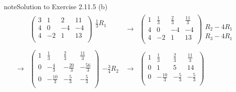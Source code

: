 \documentclass[letterpaper,10pt,english]{jupyterBook}
\begin{document}
\begin{sphinxadmonition}{note}{Solution to Exercise 2.11.5}
\sphinxAtStartPar
(b)
\begin{equation*}
\begin{split} \begin{align*} 
    & \left( \begin{array}{ccc|c} 
         3 & 1 & 2 & 11 \\ 
         4 & 0 & -4 & -4 \\ 
         4 & -2 & 1 & 13 \\ 
    \end{array} \right) 
    \begin{array}{l} \frac{1}{3} R_{1}\\ \phantom{x} \\ \phantom{x} \end{array} & 
    \longrightarrow 
    & \left( \begin{array}{ccc|c} 
         1 & \frac{1}{3} & \frac{2}{3} & \frac{11}{3} \\ 
         4 & 0 & -4 & -4 \\ 
         4 & -2 & 1 & 13 \\ 
    \end{array} \right) 
    \begin{array}{l} \phantom{x} \\ R_{2} - 4 R_{1} \\ R_{3} - 4 R_{1} \end{array} \\ \\ 
    \longrightarrow 
    & \left( \begin{array}{ccc|c} 
         1 & \frac{1}{3} & \frac{2}{3} & \frac{11}{3} \\ 
         0 & - \frac{4}{3} & - \frac{20}{3} & - \frac{56}{3} \\ 
         0 & - \frac{10}{3} & - \frac{5}{3} & - \frac{5}{3} \\ 
    \end{array} \right) 
    \begin{array}{l} \phantom{x} \\ - \frac{3}{4} R_{2}\\ \phantom{x} \end{array} & 
    \longrightarrow 
    & \left( \begin{array}{ccc|c} 
         1 & \frac{1}{3} & \frac{2}{3} & \frac{11}{3} \\ 
         0 & 1 & 5 & 14 \\ 
         0 & - \frac{10}{3} & - \frac{5}{3} & - \frac{5}{3} \\ 
    \end{array} \right) 

\end{align*}
\end{split}
\end{equation*}
\end{sphinxadmonition}
\end{document}
